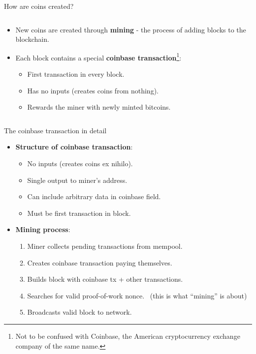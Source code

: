 \documentclass[aspectratio=169, lualatex, handout]{beamer}
\begin{document}
\begin{frame}{How are coins created?}
	\begin{columns}[c]
		\begin{column}{1\textwidth}
			\begin{itemize}
				\item New coins are created through \textbf{mining} - the process of adding blocks to the blockchain.
				\item Each block contains a special \textbf{coinbase transaction}\footnote{Not to be confused with Coinbase, the American cryptocurrency exchange company of the same name.}:
				      \begin{itemize}
					      \item First transaction in every block.
					      \item Has no inputs (creates coins from nothing).
					      \item Rewards the miner with newly minted bitcoins.
				      \end{itemize}
			\end{itemize}
		\end{column}
	\end{columns}
\end{frame}

\begin{frame}{The coinbase transaction in detail}
	\begin{itemize}
		\item \textbf{Structure of coinbase transaction}:
		      \begin{itemize}
			      \item No inputs (creates coins ex nihilo).
			      \item Single output to miner's address.
			      \item Can include arbitrary data in coinbase field.
			      \item Must be first transaction in block.
		      \end{itemize}
		\item \textbf{Mining process}:
		      \begin{enumerate}
			      \item Miner collects pending transactions from mempool.
			      \item Creates coinbase transaction paying themselves.
			      \item Builds block with coinbase tx + other transactions.
			      \item Searches for valid proof-of-work nonce. \leftarrow\ (this is what ``mining'' is about)
			      \item Broadcasts valid block to network.
		      \end{enumerate}
	\end{itemize}
\end{frame}
\end{document}
